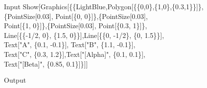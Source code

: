 \begin{mmaCell}{Input}
  Show[Graphics[\{\{LightBlue,Polygon[\{\{0,0\},\{1,0\},\{0.3,1\}\}]\},\\ \{PointSize[0.03], Point[\{0, 0\}]\},\{PointSize[0.03],\\Point[\{1, 0\}]\},\{PointSize[0.03], Point[\{0.3, 1\}]\}, \\Line[\{\{-1/2, 0\}, \{1.5, 0\}\}],Line[\{\{0, -1/2\}, \{0, 1.5\}\}],\\Text["A", \{0.1, -0.1\}], Text["B", \{1.1, -0.1\}],\\Text["C", \{0.3, 1.2\}],Text["[Alpha]", \{0.1, 0.1\}],\\Text["[Beta]", \{0.85, 0.1\}]\}]]
\end{mmaCell}
	
\begin{mmaCell}[moregraphics={moreig={scale=0.8}}]{Output}
\end{mmaCell}

